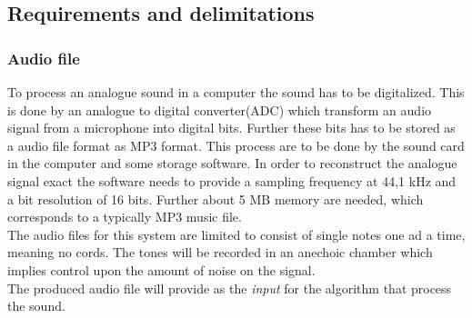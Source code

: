         
\subsection{Requirements and delimitations}
\subsubsection{Audio file}
To process an analogue sound in a computer the sound has to be digitalized. This is done by an analogue to digital converter(ADC) which transform an audio signal from a microphone into digital bits. Further these bits has to be stored as a audio file format as MP3 format. This process are to be done by the sound card in the computer and some storage software. In order to reconstruct the analogue signal exact the software needs to provide a sampling frequency at 44,1 kHz and a bit resolution of 16 bits\cite{Mic}. Further about 5 MB memory are needed, which corresponds to a typically MP3 music file. \\
The audio files for this system are limited to consist of single notes one ad a time, meaning no cords. The tones will be recorded in an anechoic chamber which implies control upon the amount of noise on the signal.\\      
The produced audio file will provide as the \textit{input} for the algorithm that process the sound. 

